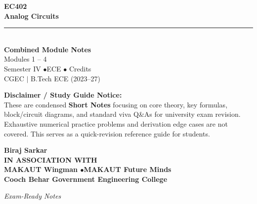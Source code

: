 \documentclass[12pt,a4paper]{article}
\begin{document}
\thispagestyle{empty}


\vspace*{1.0cm}
\begin{center}
  {\Huge\bfseries\color{myred} EC402}\\[10pt]
  {\LARGE\bfseries\color{mydark} Analog Circuits}\\[20pt]
  {\color{myred}\rule{0.7\linewidth}{1.5pt}}\\[18pt]
  {\Large\color{myteal}\textbf{Combined Module Notes}}\\[8pt]
  {\large\color{mydark} Modules 1 -- 4}\\[40pt]
  {\normalsize\color{mydark} Semester IV \quad$\bullet$\quad ECE \quad$\bullet$ Credits}\\[12pt]
  {\normalsize\color{mydark} CGEC \;$|$\; B.Tech ECE (2023--27)}
\end{center}
\vspace{1.0cm}
\begin{center}
  \begin{tcolorbox}[colback=mygray, colframe=mgframe, boxrule=0.5pt, arc=3pt, width=0.85\linewidth]
    \centering\small\color{mydark}
    \textbf{Disclaimer / Study Guide Notice:}\\
    These are condensed \textbf{Short Notes} focusing on core theory, key formulas, block/circuit diagrams, and standard viva Q\&As for university exam revision. Exhaustive numerical practice problems and derivation edge cases are not covered. This serves as a quick-revision reference guide for students.
  \end{tcolorbox}
\end{center}
\vfill
\vspace{0.6cm}
\begin{center}
  {\large\bfseries\color{mypurple} Biraj Sarkar}\\[16pt]
  {\footnotesize\color{watermark}\textbf{IN ASSOCIATION WITH}}\\[8pt]
  {\small\bfseries\color{mydark} MAKAUT Wingman \quad$\bullet$\quad MAKAUT Future Minds}\\[12pt]
  {\large\bfseries\color{myteal} Cooch Behar Government Engineering College}
\end{center}
\vfill
\begin{center}{\small\color{watermark}\textit{Exam-Ready Notes}}\end{center}
\clearpage
\end{document}
